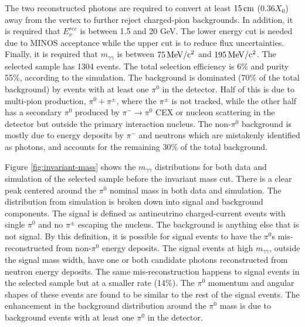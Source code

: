 The two reconstructed photons are required to convert at least $\unit[15]{cm}$ ($0.36X_0$) away
from the vertex to further reject charged-pion backgrounds. 
In addition, it is required that $E_\nu^{rec}$ is between 1.5 and 20 GeV.
The lower energy cut is needed due to MINOS acceptance while the upper cut is to reduce flux uncertainties.
Finally, it is required that $m_{\gamma\gamma}$ is between
$\unit[75]{MeV/c^2}$ and $\unit[195]{MeV/c^2}$. 
The selected sample has 1304 events. 
The total selection efficiency is 6\% and
purity 55\%, according to the simulation. 
The background is dominated (70\% of the total background) by events with at
least one $\pi^0$ in the detector. 
Half of this is due to multi-pion production, $\pi^0+\pi^{\pm}$,
where the $\pi^{\pm}$ is not tracked, while 
the other half has a secondary $\pi^0$ produced by $\pi^-\rightarrow\pi^0$ CEX 
or nucleon scattering in the detector but outside the primary
interaction nucleus. 
The non-$\pi^0$ background is mostly due to energy deposits by $\pi^-$ and neutrons
which are mistakenly
identified as photons, and accounts for the remaining 30\% of the total
background.

Figure \ref{fig:invariant-mass} shows the $m_{\gamma\gamma}$
distributions for both data and simulation of the selected sample before the
invariant mass cut. 
There is a clear peak centered around the $\pi^0$ nominal mass in both data and
simulation. 
The distribution from simulation is broken down into signal and background
components. The signal is defined as antineutrino 
charged-current events with single $\pi^0$ and no $\pi^\pm$ escaping 
the nucleus. The background is anything else that is not signal. By this definition, 
it is possible for signal events to have the $\pi^0$s mis-reconstructed from non-$\pi^0$ energy 
deposits. The signal events at high $m_{\gamma\gamma}$, outside the signal mass width, have one or 
both candidate photons reconstructed from neutron energy deposits. 
The same mis-reconstruction happens to signal events in the selected sample but at a smaller rate (14\%). 
The $\pi^0$ momentum and angular shapes of these events are found to be similar to the rest of the signal events.
The enhancement in the background distribution around the $\pi^0$
mass is due to background events with at least one $\pi^0$ in the
detector. 

